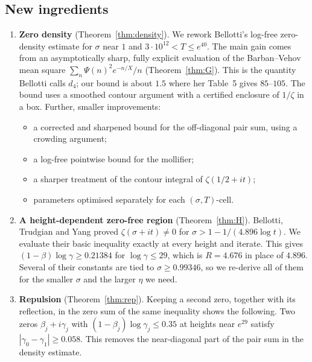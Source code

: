 \documentclass[11pt]{amsart}
\numberwithin{equation}{section}
\theoremstyle{definition}
\theoremstyle{remark}
\begin{document}
\subsection*{New ingredients}
\begin{enumerate}
\item \textbf{Zero density} (Theorem~\ref{thm:density}).
  We rework Bellotti's log-free zero-density estimate \cite{Bellotti} for $\sigma$ near $1$ and $3\cdot 10^{12} < T \le e^{40}$.
  The main gain comes from an asymptotically sharp, fully explicit evaluation of the Barban--Vehov mean square $\sum_n \Psi(n)^2 e^{-n/X}/n$ (Theorem~\ref{thm:G}).
  This is the quantity Bellotti calls $d_4$; our bound is about $1.5$ where her Table~5 gives $85$--$105$.
  The bound uses a smoothed contour argument with a certified enclosure of $1/\zeta$ in a box.
  Further, smaller improvements:
  \begin{itemize}
  \item a corrected and sharpened bound for the off-diagonal pair sum, using a crowding argument;
  \item a log-free pointwise bound for the mollifier;
  \item a sharper treatment of the contour integral of $\zeta(1/2+it)$;
  \item parameters optimised separately for each $(\sigma,T)$-cell.
  \end{itemize}
\item \textbf{A height-dependent zero-free region} (Theorem~\ref{thm:H}).
  Bellotti, Trudgian and Yang \cite{BTY} proved $\zeta(\sigma+it)\neq 0$ for $\sigma > 1 - 1/(4.896\log t)$.
  We evaluate their basic inequality exactly at every height and iterate.
  This gives $(1-\beta)\log\gamma \ge 0.21384$ for $\log\gamma \le 29$, which is $R = 4.676$ in place of $4.896$.
  Several of their constants are tied to $\sigma \ge 0.99346$, so we re-derive all of them for the smaller $\sigma$ and the larger $\eta$ we need.
\item \textbf{Repulsion} (Theorem~\ref{thm:rep}).
  Keeping a second zero, together with its reflection, in the zero sum of the same inequality shows the following.
  Two zeros $\beta_j+i\gamma_j$ with $(1-\beta_j)\log\gamma_j \le 0.35$ at heights near $e^{29}$ satisfy $|\gamma_0-\gamma_1| \ge 0.058$.
  This removes the near-diagonal part of the pair sum in the density estimate.
\end{enumerate}
\end{document}
